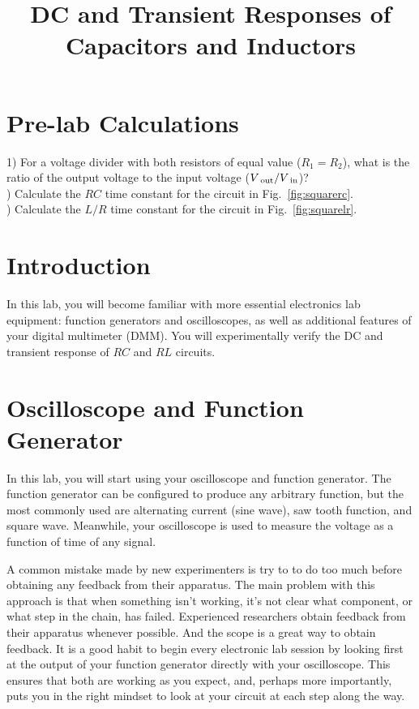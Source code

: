 \documentclass[12pt]{article}
\begin{document}
\title{DC and Transient Responses of Capacitors and Inductors}

\maketitle

\section{Pre-lab Calculations}

1) For a voltage divider with both resistors of equal value ($R_1=R_2$), what is the ratio of the output voltage to the input voltage ($V_{~\rm out} / V_{~\rm in}$)? \\ \vskip 0.2cm
) Calculate the $RC$ time constant for the circuit in Fig.~\ref{fig:squarerc}.\\ \vskip 0.2cm
) Calculate the $L/R$ time constant for the circuit in  Fig.~\ref{fig:squarelr}.\\

\section{Introduction}

In this lab, you will become familiar with more essential electronics lab equipment:  function generators and oscilloscopes, as well as additional features of your digital multimeter (DMM).  You will experimentally verify the DC and transient response of $RC$ and $RL$ circuits.

\section{Oscilloscope and Function Generator}

In this lab, you will start using your oscilloscope and function generator.  The function generator can be configured to produce any arbitrary function, but the most commonly used are alternating current (sine wave), saw tooth function, and square wave.  Meanwhile, your oscilloscope is used to measure the voltage as a function of time of any signal.

A common mistake made by new experimenters is try to to do too much before obtaining any feedback from their apparatus.  The main problem with this approach is that when something isn't working, it's not clear what component, or what step in the chain, has failed.  Experienced researchers obtain feedback from their apparatus whenever possible.  And the scope is a great way to obtain feedback.  It is a good habit to begin every electronic lab session by looking first at the output of your function generator directly with your oscilloscope.  This ensures that both are working as you expect, and, perhaps more importantly, puts you in the right mindset to look at your circuit at each step along the way.
\end{document}
